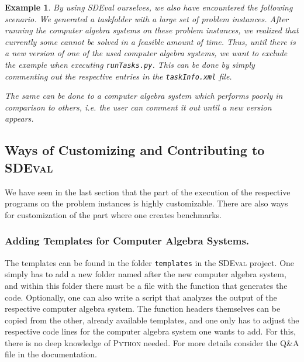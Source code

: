 \documentclass[12pt]{article}
\newtheorem{example}{Example}
\begin{document}
\begin{example}
By using SDEval ourselves, we also have encountered the following scenario. We
generated a taskfolder with a large set of problem instances. After running the
computer algebra systems on these problem instances, we realized that currently
some cannot be solved in a feasible amount of time. Thus, until there is a new
version of one of the used computer algebra systems, we want to exclude the
example when executing \texttt{runTasks.py}. This can be done by simply
commenting out the respective entries in the \texttt{taskInfo.xml} file.

The same can be done to a computer algebra system which performs poorly in
comparison to others, i.e. the user can comment it out until a new version
appears.
\end{example}

\subsection{Ways of Customizing and Contributing to \textsc{SDEval}}

We have seen in the last section that the part of the execution of the
respective programs on the problem instances is highly customizable. There are
also ways for customization of the part where one creates benchmarks.


\subsubsection{Adding Templates for Computer Algebra Systems.}

 The templates can be found in the folder \texttt{templates} in the
 \textsc{SDEval} project. One simply has to add a new folder named after the
 new computer algebra system, and within this folder there must be a file with
 the function that generates the code. Optionally, one can also write a script
 that analyzes the output of the respective computer algebra system. The
 function headers themselves can be copied from the other, already available
 templates, and one only has to adjust the respective code lines for the
 computer algebra system one wants to add. For this, there is no deep knowledge
 of \textsc{Python} needed. For more details consider the Q\&A file in the
 documentation.
\end{document}
